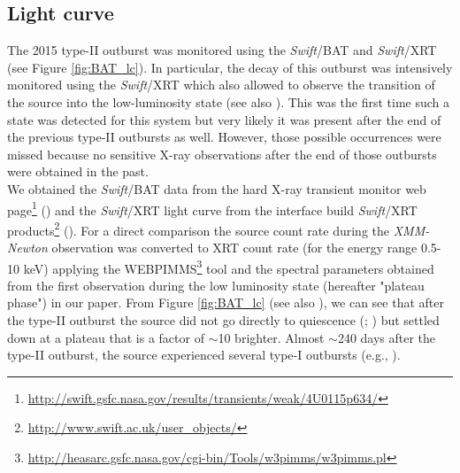 \documentclass[a4paper,fleqn,usenatbib]{mnras}
\begin{document}
\subsection{Light curve}\label{subsec:lightcurve}
The 2015 type-II outburst was monitored using the \textit{Swift}/BAT and \textit{Swift}/XRT (see Figure \ref{fig:BAT_lc}). In particular, the decay of this outburst was intensively monitored using the \textit{Swift}/XRT which also allowed to observe the transition of the source into the low-luminosity state (see also \citealt{Wijnands2016}). This was the first time such a state was detected for this system but very likely it was present after the end of the previous type-II outbursts as well. However, those possible occurrences were missed because no sensitive X-ray observations after the end of those outbursts were obtained in the past.\\
\indent We obtained the \textit{Swift}/BAT data from the hard X-ray transient monitor web page\footnote{\url{http://swift.gsfc.nasa.gov/results/transients/weak/4U0115p634/}} (\citealt{Krimm2013}) and the \textit{Swift}/XRT light curve from the interface build \textit{Swift}/XRT products\footnote{\url{http://www.swift.ac.uk/user_objects/}} (\citealt{Evans2009}). For a direct comparison the source count rate during the \textit{XMM-Newton} observation was converted to XRT count rate (for the energy range 0.5-10 keV) applying the WEBPIMMS\footnote{\url{http://heasarc.gsfc.nasa.gov/cgi-bin/Tools/w3pimms/w3pimms.pl}} tool and the spectral parameters obtained from the first observation during the low luminosity state (hereafter "plateau phase") in our paper. From Figure \ref{fig:BAT_lc} (see also \citealt{Wijnands2016}), we can see that after the type-II outburst the source did not go directly to quiescence (\citealt{Campana2002}; \citealt{Tsygankov2017b}) but settled down at a plateau that is a factor of $\sim$10 brighter. Almost $\sim$240 days after the type-II outburst, the source experienced several type-I outbursts (e.g., \citealt{Nakajima2016a,Nakajima2016b,Nakajima2016c}).\\
\end{document}
